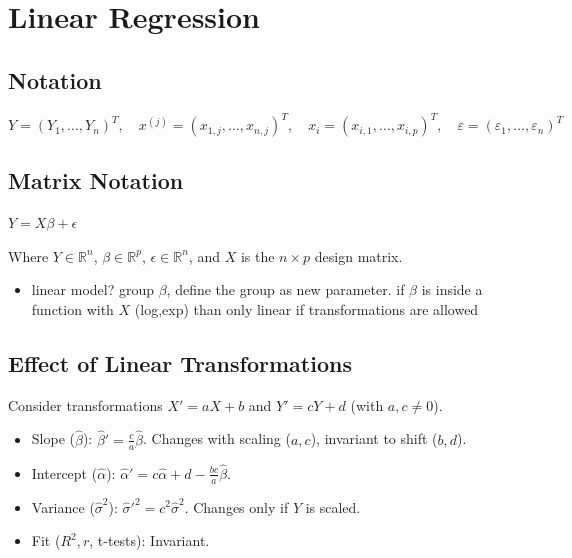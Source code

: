 
\section{Linear Regression}
\subsection*{Notation}
$Y = (Y_1, \dots, Y_n)^T, \quad x^{(j)} = (x_{1,j}, \dots, x_{n,j})^T, \quad x_i = (x_{i,1}, \dots, x_{i,p})^T, \quad \varepsilon = (\varepsilon_1, \dots, \varepsilon_n)^T$

\subsection*{Matrix Notation}
$Y = X\beta + \epsilon$

Where $Y \in \mathbb{R}^n$, $\beta \in \mathbb{R}^p$, $\epsilon \in \mathbb{R}^n$, and $X$ is the $n \times p$ design matrix.
\begin{itemize}
    \item linear model? group $\beta$, define the group as new parameter. if $\beta$ is inside a function with $X$ (log,exp) than only linear if transformations are allowed
\end{itemize}

\subsection*{Effect of Linear Transformations}
Consider transformations $X' = aX + b$ and $Y' = cY + d$ (with $a, c \neq 0$).
\begin{itemize}
    \item Slope ($\hat{\beta}$): $\hat{\beta}' = \frac{c}{a} \hat{\beta}$. Changes with scaling ($a,c$), invariant to shift ($b,d$).
    \item Intercept ($\hat{\alpha}$): $\hat{\alpha}' = c\hat{\alpha} + d - \frac{bc}{a}\hat{\beta}$.
    \item Variance ($\hat{\sigma}^2$): $\hat{\sigma}'^2 = c^2 \hat{\sigma}^2$. Changes only if $Y$ is scaled.
    \item Fit ($R^2, r$, t-tests): Invariant.
\end{itemize}

